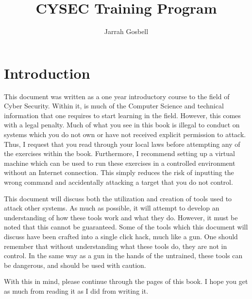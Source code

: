 \documentclass[twoside,a6paper,11pt]{report}
\author{Jarrah Gosbell}
\title{CYSEC Training Program}
\begin{document}
\frontmatter
\maketitle
\tableofcontents
	\listoffigures
	\listoftables
	{%
	 \renewcommand{\figurename}{Code Example}
	 }
\chapter{Introduction}
	This document was written as a one year introductory course to the field of Cyber Security. 
	Within it, is much of the Computer Science and technical information that one requires to start learning in the field. 
	However, this comes with a legal penalty. 
	Much of what you see in this book is illegal to conduct on systems which you do not own or have not received explicit permission to attack. 
	Thus, I request that you read through your local laws before attempting any of the exercises within the book. 
	Furthermore, I recommend setting up a virtual machine which can be used to run these exercises in a controlled environment without an Internet connection. 
	This simply reduces the risk of inputting the wrong command and accidentally attacking a target that you do not control. 

	This document will discuss both the utilization and creation of tools used to attack other systems. 
	As much as possible, it will attempt to develop an understanding of how these tools work and what they do. 
	However, it must be noted that this cannot be guaranteed. 
	Some of the tools which this document will discuss have been crafted into a single click hack, much like a gun. 
	One should remember that without understanding what these tools do, they are not in control. 
	In the same way as a gun in the hands of the untrained, these tools can be dangerous, and should be used with caution. 

	With this in mind, please continue through the pages of this book. 
	I hope you get as much from reading it as I did from writing it. 
\end{document}

